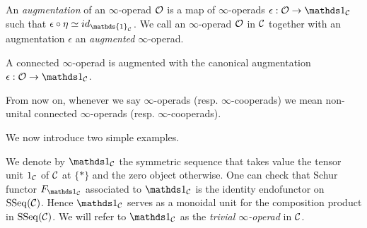
\begin{definition}
    An \emph{augmentation} of an $\infty$-operad ${\mathcal{O}}$ is a map of $\infty$-operads $\epsilon:\CO\rightarrow \triv_{\CC}$ such that $\epsilon\circ \eta\simeq id_{\mathds{1}_\CC}$.
	We call an $\infty$-operad ${\mathcal{O}}$ in ${\mathcal{C}}$ together with an augmentation $\epsilon$ an \emph{augmented} $\infty$-operad.
\end{definition}


\begin{remark}
A connected $\infty$-operad is augmented with the canonical augmentation $\epsilon:\CO \to \triv_{\CC}$.
\end{remark}  

\begin{remark}
From now on, whenever we say $\infty$-operads (resp. $\infty$-cooperads) we mean non-unital connected $\infty$-operads (resp. $\infty$-cooperads).
\end{remark}

We now introduce two simple examples.
\begin{example}
    	We denote by $\triv_{\CC}$ the symmetric sequence that takes value the tensor unit $1_{\mathcal{C}}$ of ${\mathcal{C}}$ at $\{*\}$ and the zero object otherwise. One can check that Schur functor $F_{\triv_{\CC}}$ associated to $\triv_{\CC}$ is the identity endofunctor on $\operatorname{SSeq}({\mathcal{C}})$. Hence $\triv_{\CC}$ serves as a monoidal unit for the composition product in $\operatorname{SSeq}({\mathcal{C}})$.
	We will refer to $\triv_{\CC}$ as the \emph{trivial $\infty$-operad} in ${\mathcal{C}}$.
\end{example}


